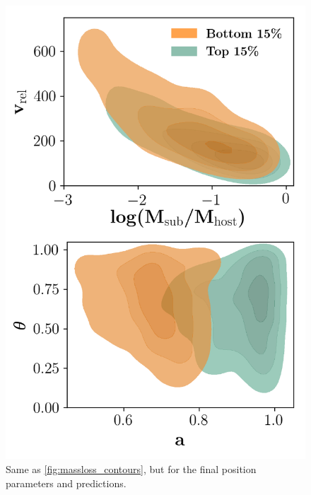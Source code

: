 \documentclass[fleqn,usenatbib]{mnras}
\begin{document}
{\begin{figure}
	\includegraphics[width=\textwidth]{Figures/position_contours}
	\vspace{-20pt}
    \caption{Same as \ref{fig:massloss_contours}, but for the final position parameters and predictions.}
    \label{fig:position_contours}
\end{figure}

}
\end{document}
